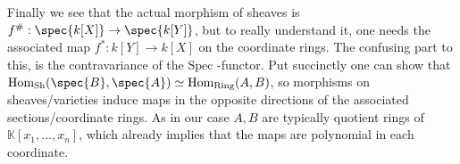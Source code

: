 \begin{example}
    \newline
    Finally we see that the actual morphism of sheaves is \( f^\# : \spec{k[X]} \to \spec{k[Y]} \), but to really understand it, one needs the associated map
    \( f^\ast : k[Y] \to k[X] \) on the coordinate rings. The confusing part to this, is the contravariance of the \( \text{Spec } \)-functor. Put succinctly 
    one can show that \( \text{Hom}_{\text{Sh}}(\spec{B}, \spec{A}) \simeq \text{Hom}_{\text{Ring}}(A, B) \), so morphisms on sheaves/varieties induce 
    maps in the opposite directions of the associated sections/coordinate rings. As in our case \( A, B \) are typically quotient rings of \( \mathbb{K}[x_1, \dots, x_n] \),
    which already implies that the maps are polynomial in each coordinate.
\end{example}

